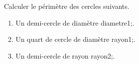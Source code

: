 \documentclass[exercice]{thedocument}%
\begin{document}
%
\smallskip\par\noindent Calculer le périmètre des cercles suivants.
\begin{enumerate}
    \item Un demi-cercle de diamètre \<diametre1;.
    \item Un quart de cercle de diamètre \<rayon1;.
    \item Un demi-cercle de rayon \<rayon2;.
\end{enumerate}
\end{document}
